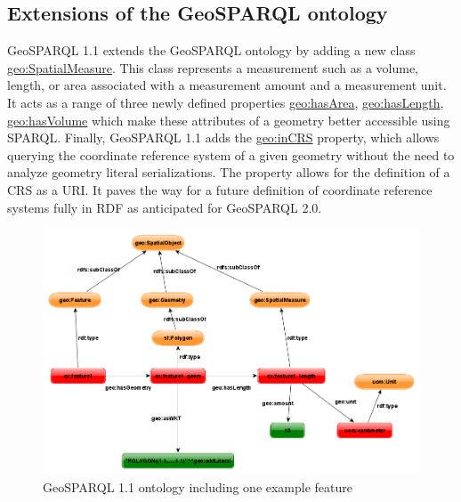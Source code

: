 \documentclass[runningheads]{llncs}
\begin{document}
\subsection{Extensions of the GeoSPARQL ontology}\label{sec:ontologyextensions}
GeoSPARQL 1.1 extends the GeoSPARQL ontology by adding a new class \href{http://www.opengis.net/ont/geosparql#SpatialMeasure}{geo:SpatialMeasure}. This class represents a measurement such as a volume, length, or area associated with a measurement amount and a measurement unit. It acts as a range of three newly defined properties \href{http://www.opengis.net/ont/geosparql#hasVolume}{geo:hasArea}, \href{http://www.opengis.net/ont/geosparql#hasLength}{geo:hasLength},
\href{http://www.opengis.net/ont/geosparql#hasVolume}{geo:hasVolume} which make these attributes of a geometry better accessible using SPARQL. Finally, GeoSPARQL 1.1 adds the \href{http://www.opengis.net/ont/geosparql#inCRS}{geo:inCRS} property, which allows querying the coordinate reference system of a given geometry without the need to analyze geometry literal serializations. The property allows for the definition of a CRS as a URI. It paves the way for a future definition of coordinate reference systems fully in RDF as anticipated for GeoSPARQL 2.0.
\begin{figure}[htb]
    \centering
    \includegraphics[width=\linewidth]{images/geold_ontology.png}
    \caption{GeoSPARQL 1.1 ontology including one example feature}
    \label{fig:geosparql11ontology}
\end{figure}
\end{document}
